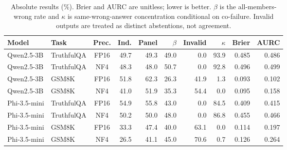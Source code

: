 \begin{table}[t]
\centering
\small
\setlength{\tabcolsep}{4.2pt}
\begin{tabular}{llcrrrrrrr}
\toprule
Model & Task & Prec. & Ind. & Panel & $\beta$ & Invalid & $\kappa$ & Brier & AURC \\
\midrule
Qwen2.5-3B & TruthfulQA & FP16 & 49.7 & 49.3 & 49.0 & 0.0 & 93.9 & 0.485 & 0.486 \\
Qwen2.5-3B & TruthfulQA & NF4 & 48.3 & 48.0 & 50.7 & 0.0 & 92.8 & 0.496 & 0.499 \\
Qwen2.5-3B & GSM8K & FP16 & 51.8 & 62.3 & 26.3 & 41.9 & 1.3 & 0.093 & 0.102 \\
Qwen2.5-3B & GSM8K & NF4 & 41.0 & 51.9 & 35.3 & 54.4 & 0.0 & 0.095 & 0.158 \\
\midrule
Phi-3.5-mini & TruthfulQA & FP16 & 54.9 & 55.8 & 43.0 & 0.0 & 84.5 & 0.409 & 0.415 \\
Phi-3.5-mini & TruthfulQA & NF4 & 50.2 & 50.0 & 48.0 & 0.0 & 86.8 & 0.455 & 0.466 \\
Phi-3.5-mini & GSM8K & FP16 & 33.3 & 47.4 & 40.0 & 63.1 & 0.0 & 0.114 & 0.197 \\
Phi-3.5-mini & GSM8K & NF4 & 26.5 & 41.1 & 45.0 & 70.6 & 0.7 & 0.126 & 0.264 \\
\bottomrule
\end{tabular}
\caption{Absolute results (\%). Brier and AURC are unitless; lower is better. $\beta$ is the all-members-wrong rate and $\kappa$ is same-wrong-answer concentration conditional on co-failure. Invalid outputs are treated as distinct abstentions, not agreement.}
\label{tab:absolute}
\end{table}
